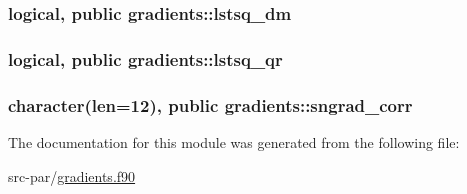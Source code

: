 \hypertarget{classgradients_a65547c6133cbc486266ac66604342516}{
\subsubsection[{lstsq\-\_\-dm}]{\setlength{\rightskip}{0pt plus 5cm}logical, public gradients\-::lstsq\-\_\-dm}}\label{classgradients_a65547c6133cbc486266ac66604342516}
\hypertarget{classgradients_ae25a8c84c0815435812f94b82d7dafb7}{
\subsubsection[{lstsq\-\_\-qr}]{\setlength{\rightskip}{0pt plus 5cm}logical, public gradients\-::lstsq\-\_\-qr}}\label{classgradients_ae25a8c84c0815435812f94b82d7dafb7}
\hypertarget{classgradients_ae02e791dcca067360cb4c1802dd6ef8d}{
\subsubsection[{sngrad\-\_\-corr}]{\setlength{\rightskip}{0pt plus 5cm}character(len=12), public gradients\-::sngrad\-\_\-corr}}\label{classgradients_ae02e791dcca067360cb4c1802dd6ef8d}


The documentation for this module was generated from the following file\-:\begin{DoxyCompactItemize}
\item 
src-\/par/\hyperlink{gradients_8f90}{gradients.\-f90}\end{DoxyCompactItemize}

